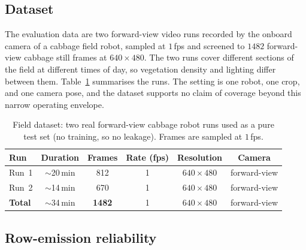 \subsection{Dataset}
\label{sec:res-dataset}

The evaluation data are two forward-view video runs recorded by the onboard camera
of a cabbage field robot, sampled at $1$\,fps and screened to $1482$ forward-view
cabbage still frames at $640\times480$. The
two runs cover different sections of the field at different times of day, so
vegetation density and lighting differ between them. Table~\ref{tab:res-dataset}
summarises the runs. The setting is one robot, one crop, and one camera pose, and
the dataset supports no claim of coverage beyond this narrow operating envelope.

{\renewcommand{\arraystretch}{1.2}
\begin{table}[!ht]
  \centering
  \caption{Field dataset: two real forward-view cabbage robot runs used as a
    pure test set (no training, so no leakage). Frames are sampled at $1$\,fps.}
  \label{tab:res-dataset}
  \begin{tabular}{lccccc}
    \hline
    \textbf{Run} & \textbf{Duration} & \textbf{Frames} & \textbf{Rate (fps)} & \textbf{Resolution} & \textbf{Camera} \\
    \hline
    Run~1 & $\sim$20\,min & 812 & 1 & $640\times480$ & forward-view \\
    Run~2 & $\sim$14\,min & 670  & 1 & $640\times480$ & forward-view \\
    \hline
    \textbf{Total} & $\sim$34\,min & \textbf{1482} & 1 & $640\times480$ & forward-view \\
    \hline
  \end{tabular}
\end{table}}

\subsection{Row-emission reliability}
\label{sec:res-reliability}

